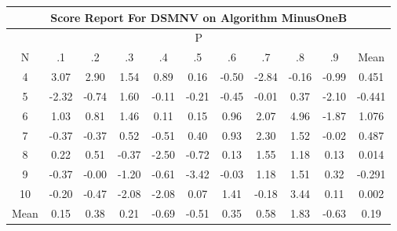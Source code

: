 \documentclass[11pt,a4paper]{report}
\begin{document}
\begin{longtable}{ | c || c | c | c | c | c | c | c | c | c || c |}
\hline
\multicolumn{11}{|c|}{ Score Report For DSMNV on Algorithm MinusOneB} \\
\hline
\multicolumn{11}{|c|}{ P } \\
\hline
N & .1 & .2 & .3 & .4 & .5 & .6 & .7 & .8 & .9 & Mean\\
 \hline
 \hline
 \endhead
  4 &  \cellcolor[HTML]{AFAFFF} 3.07 &  \cellcolor[HTML]{B7B7FF} 2.90 &  \cellcolor[HTML]{D7D7FF} 1.54 &  \cellcolor[HTML]{E7E7FF} 0.89 &  \cellcolor[HTML]{FFFFFF} 0.16 &  \cellcolor[HTML]{FFEFEF} -0.50 &  \cellcolor[HTML]{FFB7B7} -2.84 &  \cellcolor[HTML]{FFF7F7} -0.16 &  \cellcolor[HTML]{FFE7E7} -0.99 & 0.451 \\
  5 &  \cellcolor[HTML]{FFC7C7} -2.32 &  \cellcolor[HTML]{FFEFEF} -0.74 &  \cellcolor[HTML]{D7D7FF} 1.60 &  \cellcolor[HTML]{FFFFFF} -0.11 &  \cellcolor[HTML]{FFF7F7} -0.21 &  \cellcolor[HTML]{FFF7F7} -0.45 &  \cellcolor[HTML]{FFFFFF} -0.01 &  \cellcolor[HTML]{F7F7FF} 0.37 &  \cellcolor[HTML]{FFC7C7} -2.10 & -0.441 \\
  6 &  \cellcolor[HTML]{E7E7FF} 1.03 &  \cellcolor[HTML]{E7E7FF} 0.81 &  \cellcolor[HTML]{D7D7FF} 1.46 &  \cellcolor[HTML]{FFFFFF} 0.11 &  \cellcolor[HTML]{FFFFFF} 0.15 &  \cellcolor[HTML]{E7E7FF} 0.96 &  \cellcolor[HTML]{C7C7FF} 2.07 &  \cellcolor[HTML]{8080FF} 4.96 &  \cellcolor[HTML]{FFCFCF} -1.87 & 1.076 \\
  7 &  \cellcolor[HTML]{FFF7F7} -0.37 &  \cellcolor[HTML]{FFF7F7} -0.37 &  \cellcolor[HTML]{EFEFFF} 0.52 &  \cellcolor[HTML]{FFEFEF} -0.51 &  \cellcolor[HTML]{F7F7FF} 0.40 &  \cellcolor[HTML]{E7E7FF} 0.93 &  \cellcolor[HTML]{C7C7FF} 2.30 &  \cellcolor[HTML]{D7D7FF} 1.52 &  \cellcolor[HTML]{FFFFFF} -0.02 & 0.487 \\
  8 &  \cellcolor[HTML]{F7F7FF} 0.22 &  \cellcolor[HTML]{EFEFFF} 0.51 &  \cellcolor[HTML]{FFF7F7} -0.37 &  \cellcolor[HTML]{FFBFBF} -2.50 &  \cellcolor[HTML]{FFEFEF} -0.72 &  \cellcolor[HTML]{FFFFFF} 0.13 &  \cellcolor[HTML]{D7D7FF} 1.55 &  \cellcolor[HTML]{DFDFFF} 1.18 &  \cellcolor[HTML]{FFFFFF} 0.13 & 0.014 \\
  9 &  \cellcolor[HTML]{FFF7F7} -0.37 &  \cellcolor[HTML]{FFFFFF} -0.00 &  \cellcolor[HTML]{FFDFDF} -1.20 &  \cellcolor[HTML]{FFEFEF} -0.61 &  \cellcolor[HTML]{FFA7A7} -3.42 &  \cellcolor[HTML]{FFFFFF} -0.03 &  \cellcolor[HTML]{DFDFFF} 1.18 &  \cellcolor[HTML]{D7D7FF} 1.51 &  \cellcolor[HTML]{F7F7FF} 0.32 & -0.291 \\
  10 &  \cellcolor[HTML]{FFF7F7} -0.20 &  \cellcolor[HTML]{FFF7F7} -0.47 &  \cellcolor[HTML]{FFC7C7} -2.08 &  \cellcolor[HTML]{FFC7C7} -2.08 &  \cellcolor[HTML]{FFFFFF} 0.07 &  \cellcolor[HTML]{DFDFFF} 1.41 &  \cellcolor[HTML]{FFF7F7} -0.18 &  \cellcolor[HTML]{A7A7FF} 3.44 &  \cellcolor[HTML]{FFFFFF} 0.11 & 0.002 \\
 \hline
 \hline
Mean &  \cellcolor[HTML]{FFFFFF} 0.15 &  \cellcolor[HTML]{F7F7FF} 0.38 &  \cellcolor[HTML]{F7F7FF} 0.21 &  \cellcolor[HTML]{FFEFEF} -0.69 &  \cellcolor[HTML]{FFEFEF} -0.51 &  \cellcolor[HTML]{F7F7FF} 0.35 &  \cellcolor[HTML]{EFEFFF} 0.58 &  \cellcolor[HTML]{CFCFFF} 1.83 &  \cellcolor[HTML]{FFEFEF} -0.63 &  \cellcolor[HTML]{F7F7FF} 0.19
\end{longtable}
\end{document}
